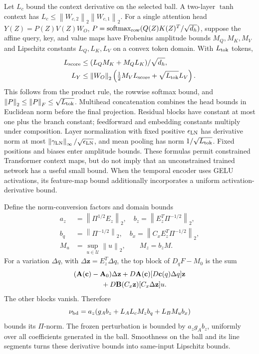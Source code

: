 \documentclass[journal]{IEEEtran}
\newcommand{\vz}{\mathbf{z}}
\newcommand{\vc}{\mathbf{c}}
\newcommand{\mA}{\mathbf{A}}
\newcommand{\mB}{\mathbf{B}}
\newcommand{\norm}[1]{\left\lVert #1\right\rVert}
\begin{document}
Let $L_c$ bound the context derivative on the selected ball. A two-layer $\tanh$ context has $L_c\le\norm{W_{c,2}}_2\norm{W_{c,1}}_2$. For a single attention head $Y(Z)=P(Z)V(Z)W_O$, $P=\operatorname{softmax}_{\rm row}(Q(Z)K(Z)^T/\sqrt{d_h})$, suppose the affine query, key, and value maps have Frobenius amplitude bounds $M_Q,M_K,M_V$ and Lipschitz constants $L_Q,L_K,L_V$ on a convex token domain. With $L_{\rm tok}$ tokens,
\begin{equation}
\begin{split}
L_{\rm score}&\le(L_QM_K+M_QL_K)/\sqrt{d_h},\\
L_Y&\le\norm{W_O}_2\left(\tfrac12M_VL_{\rm score}
+\sqrt{L_{\rm tok}}L_V\right).
\end{split}
\label{eq:attention_bound}
\end{equation}
This follows from the product rule, the rowwise softmax bound, and $\norm{P}_2\le\norm{P}_F\le\sqrt{L_{\rm tok}}$. Multihead concatenation combines the head bounds in Euclidean norm before the final projection. Residual blocks have constant at most one plus the branch constant; feedforward and embedding constants multiply under composition. Layer normalization with fixed positive $\epsilon_{\rm LN}$ has derivative norm at most $\norm{\gamma_{\rm LN}}_\infty/\sqrt{\epsilon_{\rm LN}}$, and mean pooling has norm $1/\sqrt{L_{\rm tok}}$. Fixed positions and biases enter amplitude bounds. These formulas permit constrained Transformer context maps, but do not imply that an unconstrained trained network has a useful small bound. When the temporal encoder uses GELU activations, its feature-map bound additionally incorporates a uniform activation-derivative bound.

Define the norm-conversion factors and domain bounds
\begin{equation}
\begin{split}
a_z&=\norm{\Pi^{1/2}E_z}_2,\quad
b_z=\norm{E_z^T\Pi^{-1/2}}_2,\\
b_q&=\norm{\Pi^{-1/2}}_2,\quad
b_x=\norm{C_xE_z^T\Pi^{-1/2}}_2,\\
M_u&=\sup_{u\in\mathcal U}\norm{u}_2,\qquad M_z=b_zM.
\end{split}
\label{eq:norm_conversion}
\end{equation}
For a variation $\Delta q$, with $\Delta\vz=E_z^T\Delta q$, the top block of $D_qF-M_0$ is the sum
\begin{equation}
\begin{split}
&(\mA(\vc)-\mA_0)\Delta\vz
+D\mA(\vc)[D\vc(q)\Delta q]\vz\\
&\hspace{14mm}+D\mB(C_x\vz)[C_x\Delta\vz]u.
\end{split}
\label{eq:full_derivative}
\end{equation}
The other blocks vanish. Therefore
\begin{equation}
\nu_{\rm bd}=a_z(g_A b_z+L_A L_cM_zb_q+L_BM_ub_x)
\label{eq:derivative_budget}
\end{equation}
bounds its $\Pi$-norm. The frozen perturbation is bounded by $a_zg_A b_z$, uniformly over all coefficients generated in the ball. Smoothness on the ball and its line segments turns these derivative bounds into same-input Lipschitz bounds.
\end{document}
